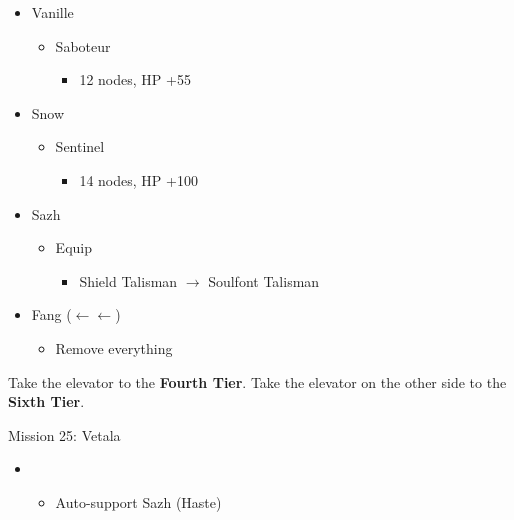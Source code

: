 \begin{multicols}{2}
\begin{menu}
\begin{itemize}
\begin{itemize}
\begin{itemize}
        \end{itemize}
        \item Vanille
        \begin{itemize}
            \item Saboteur
            \begin{itemize}
                \item 12 nodes, HP +55
            \end{itemize}
        \end{itemize}
        \item Snow
        \begin{itemize}
            \item Sentinel
            \begin{itemize}
                \item 14 nodes, HP +100
            \end{itemize}
        \end{itemize}
    \end{itemize}
    \equip
    \begin{itemize}
        \item Sazh
        \begin{itemize}
            \item Equip
            \begin{itemize}
                \item Shield Talisman $\rightarrow$ Soulfont Talisman
            \end{itemize}
        \end{itemize}
        \item Fang ($\leftarrow\leftarrow$)
        \begin{itemize}
            \item Remove everything
        \end{itemize}
    \end{itemize}
\end{itemize}
\end{menu}
Take the elevator to the \textbf{Fourth Tier}.
Take the elevator on the other side to the \textbf{Sixth Tier}.
\renewcommand{\fifth}{[5] Smart Bomb (\rav/\sab/\rav)}
\begin{battle}{Mission 25: Vetala}
\begin{itemize}
    \item \first
    \begin{itemize}
        \item Auto-support Sazh (Haste)

\end{itemize}
\end{itemize}
\end{battle}
\end{multicols}
